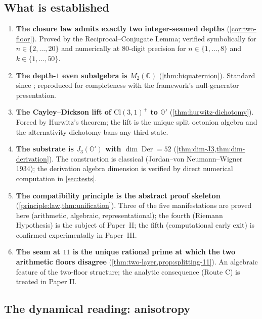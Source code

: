 \documentclass[11pt,a4paper]{article}
\theoremstyle{plain}
\theoremstyle{definition}
\theoremstyle{remark}
\numberwithin{equation}{section}
\providecommand{\Cl}{\mathrm{Cl}}
\providecommand{\C}{\mathbb{C}}
\providecommand{\Os}{\mathbb{O}'}
\DeclareMathOperator{\Der}{Der}
\begin{document}
\subsection*{What is established}

\begin{enumerate}[label=\textnormal{(\arabic*)}]
\item \textbf{The closure law admits exactly two integer-seamed
  depths} (\cref{cor:two-floor}).  Proved by the
  Reciprocal--Conjugate Lemma; verified symbolically for $n
  \in \{2, \ldots, 20\}$ and numerically at $80$-digit precision
  for $n \in \{1, \ldots, 8\}$ and $k \in \{1, \ldots, 50\}$.

\item \textbf{The depth-$1$ even subalgebra is $M_2(\C)$}
  (\cref{thm:biquaternion}).  Standard since
  \cite{hestenes-sobczyk}; reproduced for completeness with the
  framework's null-generator presentation.

\item \textbf{The Cayley--Dickson lift of $\Cl(3,1)^+$ to $\Os$}
  (\cref{thm:hurwitz-dichotomy}).  Forced by Hurwitz's theorem;
  the lift is the unique split octonion algebra and the
  alternativity dichotomy bans any third state.

\item \textbf{The substrate is $J_3(\Os)$ with $\dim\Der = 52$}
  (\cref{thm:dim-J3,thm:dim-derivation}).  The construction is
  classical (Jordan--von Neumann--Wigner 1934); the derivation
  algebra dimension is verified by direct numerical computation
  in \cref{sec:tests}.

\item \textbf{The compatibility principle is the abstract proof
  skeleton} (\cref{principle:law,thm:unification}).  Three of the
  five manifestations are proved here (arithmetic, algebraic,
  representational); the fourth (Riemann Hypothesis) is the
  subject of Paper~II; the fifth (computational early exit) is
  confirmed experimentally in Paper~III.

\item \textbf{The seam at $11$ is the unique rational prime at
  which the two arithmetic floors disagree} (\cref{thm:two-layer,prop:splitting-11}).
  An algebraic feature of the two-floor structure; the analytic
  consequence (Route C) is treated in Paper II.
\end{enumerate}

\subsection*{The dynamical reading: anisotropy}
\end{document}
